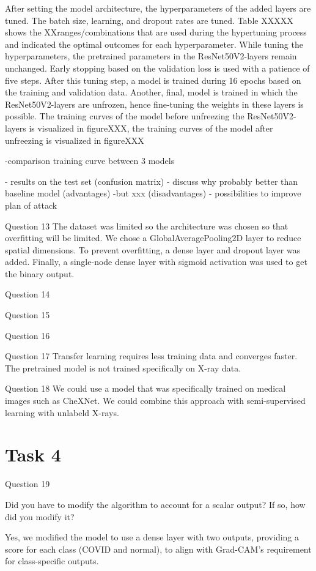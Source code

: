 \documentclass[conference]{IEEEtran}
\begin{document}
After setting the model architecture, the hyperparameters of the added layers are tuned. The batch size, learning, and dropout rates are tuned. Table XXXXX shows the XXranges/combinations that are used during the hypertuning process and indicated the optimal outcomes for each hyperparameter. 
While tuning the hyperparameters, the pretrained parameters in the ResNet50V2-layers remain unchanged. Early stopping based on the validation loss is used with a patience of five steps. After this tuning step, a model is trained during 16 epochs based on the training and validation data. Another, final, model is trained in which the ResNet50V2-layers are unfrozen, hence fine-tuning the weights in these layers is possible. The training curves of the model before unfreezing the ResNet50V2-layers is visualized in figureXXX, the training curves of the model after unfreezing is visualized in figureXXX


-comparison training curve between 3 models

- results on the test set (confusion matrix)
- discuss why probably better than baseline model (advantages)
-but xxx (disadvantages)
- possibilities to improve plan of attack

Question 13
The dataset was limited so the architecture was chosen so that overfitting will be limited. We chose a GlobalAveragePooling2D layer to reduce spatial dimensions.
To prevent overfitting, a dense layer and dropout layer was added. Finally, a single-node dense layer with sigmoid activation was used to get the binary output.

Question 14

Question 15

Question 16

Question 17
Transfer learning requires less training data and converges faster. 
The pretrained model is not trained specifically on X-ray data.

Question 18
We could use a model that was specifically trained on medical images such as CheXNet.
We could combine this approach with semi-supervised learning with unlabeld X-rays.

\section{Task 4}

Question 19

Did you have to modify the algorithm to account for a scalar output? If so, how did you modify it?

Yes, we modified the model to use a dense layer with two outputs, providing a score for each class (COVID and normal), to align with Grad-CAM’s requirement for class-specific outputs.
\end{document}
